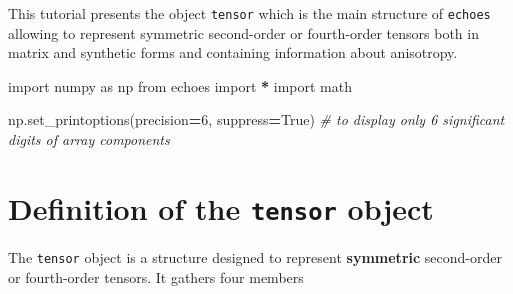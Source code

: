 \documentclass[
  a4paper,
  numbers=noendperiod,
  DIV=12]{scrreprt}
\newenvironment{Shaded}{\begin{snugshade}}{\end{snugshade}}
\newcommand{\CommentTok}[1]{\textcolor[rgb]{0.56,0.35,0.01}{\textit{#1}}}
\newcommand{\DecValTok}[1]{\textcolor[rgb]{0.00,0.00,0.81}{#1}}
\newcommand{\ImportTok}[1]{#1}
\newcommand{\NormalTok}[1]{#1}
\newcommand{\OperatorTok}[1]{\textcolor[rgb]{0.81,0.36,0.00}{\textbf{#1}}}
\newcommand{\VariableTok}[1]{\textcolor[rgb]{0.00,0.00,0.00}{#1}}
\begin{document}
\begin{tcolorbox}[enhanced jigsaw, arc=.35mm, bottomrule=.15mm, bottomtitle=1mm, breakable, colback=white, colbacktitle=quarto-callout-important-color!10!white, colframe=quarto-callout-important-color-frame, coltitle=black, left=2mm, leftrule=.75mm, opacityback=0, opacitybacktitle=0.6, rightrule=.15mm, title={Objectives}, titlerule=0mm, toprule=.15mm, toptitle=1mm]

This tutorial presents the object \texttt{tensor} which is the main
structure of \texttt{echoes} allowing to represent symmetric
second-order or fourth-order tensors both in matrix and synthetic forms
and containing information about anisotropy.

\end{tcolorbox}

\begin{tcolorbox}[enhanced jigsaw, arc=.35mm, bottomrule=.15mm, bottomtitle=1mm, breakable, colback=white, colbacktitle=quarto-callout-tip-color!10!white, colframe=quarto-callout-tip-color-frame, coltitle=black, left=2mm, leftrule=.75mm, opacityback=0, opacitybacktitle=0.6, rightrule=.15mm, title={Imports}, titlerule=0mm, toprule=.15mm, toptitle=1mm]

\begin{Shaded}
\begin{Highlighting}[]
\ImportTok{import}\NormalTok{ numpy }\ImportTok{as}\NormalTok{ np}
\ImportTok{from}\NormalTok{ echoes }\ImportTok{import} \OperatorTok{*}
\ImportTok{import}\NormalTok{ math}

\NormalTok{np.set\_printoptions(precision}\OperatorTok{=}\DecValTok{6}\NormalTok{, suppress}\OperatorTok{=}\VariableTok{True}\NormalTok{)}
\CommentTok{\# to display only 6 significant digits of array components}
\end{Highlighting}
\end{Shaded}

\end{tcolorbox}

\section{\texorpdfstring{Definition of the \texttt{tensor}
object}{Definition of the tensor object}}\label{definition-of-the-tensor-object}

The \texttt{tensor} object is a structure designed to represent
\textbf{symmetric} second-order or fourth-order tensors. It gathers four
members
\end{document}
